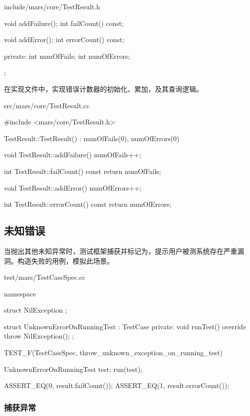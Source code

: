 \begin{content}
\begin{nodiff}{include/mars/core/TestResult.h}
\begin{c++}
{  void addFailure();
  int failCount() const;

  void addError();
  int errorCount() const;

private:
  int numOfFails;
  int numOfErrors;
};
  \end{c++}
\end{nodiff}

在实现文件中，实现错误计数器的初始化、累加，及其查询逻辑。

\begin{nodiff}{src/mars/core/TestResult.cc}
 \begin{c++}
#include <mars/core/TestResult.h>

TestResult::TestResult()
  : numOfFails(0), numOfErrors(0) {
}

void TestResult::addFailure() {
  numOfFails++;
}

int TestResult::failCount() const {
  return numOfFails;
}

void TestResult::addError() {
  numOfErrors++;
}

int TestResult::errorCount() const {
  return numOfErrors;
}
  \end{c++}
\end{nodiff}

\subsection{未知错误}

当抛出其他未知异常时，测试框架捕获并标记为，提示用户被测系统存在严重漏洞。构造失败的用例，模拟此场景。

\begin{nodiff}{test/mars/TestCaseSpec.cc}
 \begin{c++}
namespace {
  struct NilException {};

  struct UnknownErrorOnRunningTest : TestCase {
  private:
    void runTest() override {
      throw NilException();
    }
  };
}

TEST_F(TestCaseSpec, throw_unknown_exception_on_running_test) {
  UnknownErrorOnRunningTest test;
  run(test);

  ASSERT_EQ(0, result.failCount());
  ASSERT_EQ(1, result.errorCount());
}
 \end{c++}
\end{nodiff}

\subsubsection{捕获异常}


\end{content}
